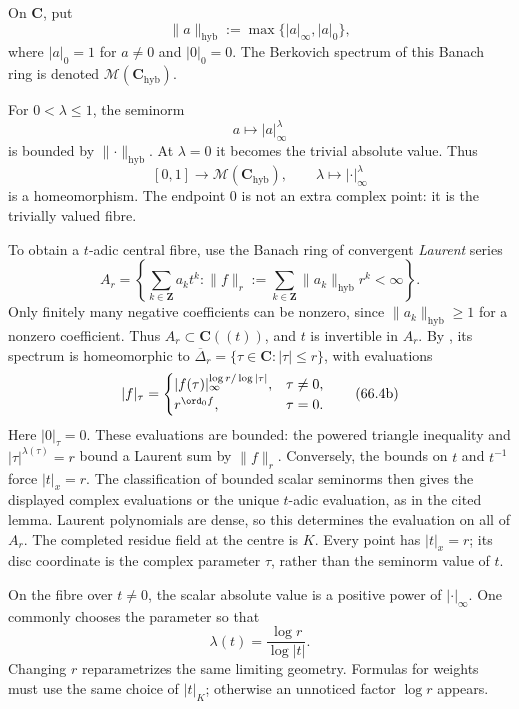 \begin{definition}
\label{def:hybrid-norm}
On $\mathbf C$, put
\[
             \lVert a\rVert_{\mathrm{hyb}}
             :=\max\{|a|_\infty,|a|_0\},
\tag{66.2}\label{eq:hybrid-norm}
\]
where $|a|_0=1$ for $a\neq0$ and $|0|_0=0$. The Berkovich spectrum of this Banach ring is denoted $\mathcal M(\mathbf C_{\mathrm{hyb}})$.
\end{definition}

For $0<\lambda\leq1$, the seminorm
\[
                            a\longmapsto |a|_\infty^\lambda
\tag{66.3}\label{eq:hybrid-seminorm}
\]
is bounded by $\lVert\cdot\rVert_{\mathrm{hyb}}$. At
$\lambda=0$ it becomes the trivial absolute value. Thus
\[
       [0,1]\longrightarrow\mathcal M(\mathbf C_{\mathrm{hyb}}),
       \qquad
       \lambda\longmapsto|\cdot|_\infty^\lambda
\tag{66.4}\label{eq:hybrid-spectrum-parametrization}
\]
is a homeomorphism. The endpoint $0$ is not an extra complex
point: it is the trivially valued fibre.

To obtain a $t$-adic central fibre, use the Banach ring of convergent
\emph{Laurent} series
\[
 A_r=\left\{\sum_{k\in\mathbf Z}a_kt^k:
       \|f\|_r:=\sum_{k\in\mathbf Z}\|a_k\|_{\mathrm{hyb}}r^k<\infty\right\}.
\tag{66.4a}\label{eq:hybrid-laurent-ring}
\]
Only finitely many negative coefficients can be nonzero, since
$\|a_k\|_{\mathrm{hyb}}\geq1$ for a nonzero coefficient. Thus
$A_r\subset\mathbf C((t))$, and $t$ is invertible in $A_r$.
By \cite[Lemma~1.20]{PS23Hybrid}, its spectrum is homeomorphic to
$\overline\Delta_r=\{\tau\in\mathbf C:|\tau|\leq r\}$, with evaluations
\[
 |f|_\tau=
 \begin{cases}
 |f(\tau)|_\infty^{\log r/\log|\tau|},&\tau\ne0,\\
 r^{\ord_0 f},&\tau=0.
 \end{cases}
\tag{66.4b}\label{eq:hybrid-base-evaluations}
\]
Here $|0|_\tau=0$. These evaluations are bounded: the powered triangle
inequality and $|\tau|^{\lambda(\tau)}=r$ bound a Laurent sum by
$\|f\|_r$. Conversely, the bounds on $t$ and $t^{-1}$ force $|t|_x=r$.
The classification of bounded scalar seminorms then gives the displayed
complex evaluations or the unique $t$-adic evaluation, as in the cited
lemma. Laurent polynomials are dense, so this determines the evaluation
on all of $A_r$. The completed residue field at the centre is $K$.
Every point has $|t|_x=r$; its disc coordinate is the complex parameter
$\tau$, rather than the seminorm value of $t$.

\begin{remark}[Normalization]
\label{rem:hybrid-normalization}
On the fibre over $t\neq0$, the scalar absolute value is a positive power of $|\cdot|_\infty$. One commonly chooses the parameter so that
\[
                 \lambda(t)=\frac{\log r}{\log|t|}.
\tag{66.5}\label{eq:hybrid-lambda}
\]
Changing $r$ reparametrizes the same limiting geometry. Formulas for weights must use the same choice of $|t|_K$; otherwise an unnoticed factor $\log r$ appears.
\end{remark}

